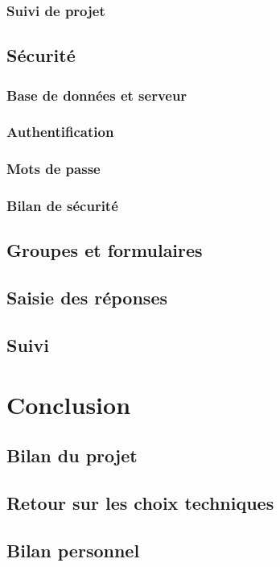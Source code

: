 \documentclass[11pt,french]{memoir}
\begin{document}
	\subsection{Suivi de projet}\label{subsec:suivi-de-projet}


	\section{Sécurité}\label{sec:securite}

	\subsection{Base de données et serveur}\label{subsec:base-de-donnees-et-serveur}

	\subsection{Authentification}\label{subsec:authentification}

	\subsection{Mots de passe}\label{subsec:mots-de-passe}

	\subsection{Bilan de sécurité}\label{subsec:bilan-de-securité}


	\section{Groupes et formulaires}\label{sec:groupes-et-formulaires}


	\section{Saisie des réponses}\label{sec:saisie-des-reponses}


	\section{Suivi}\label{sec:suivi}


	\chapter{Conclusion}\label{ch:conclusion}


	\section{Bilan du projet}\label{sec:bilan-du-projet}


	\section{Retour sur les choix techniques}\label{sec:retour-sur-les-choix-techniques}


	\section{Bilan personnel}\label{sec:bilan-personnel}

	\appendix
\end{document}

